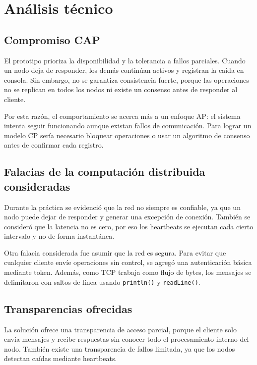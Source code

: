 \documentclass[12pt,a4paper]{article}
\begin{document}
\section{Análisis técnico}

\subsection{Compromiso CAP}

El prototipo prioriza la disponibilidad y la tolerancia a fallos parciales. Cuando un nodo deja de responder, los demás continúan activos y registran la caída en consola. Sin embargo, no se garantiza consistencia fuerte, porque las operaciones no se replican en todos los nodos ni existe un consenso antes de responder al cliente.

Por esta razón, el comportamiento se acerca más a un enfoque AP: el sistema intenta seguir funcionando aunque existan fallos de comunicación. Para lograr un modelo CP sería necesario bloquear operaciones o usar un algoritmo de consenso antes de confirmar cada registro.

\subsection{Falacias de la computación distribuida consideradas}

Durante la práctica se evidenció que la red no siempre es confiable, ya que un nodo puede dejar de responder y generar una excepción de conexión. También se consideró que la latencia no es cero, por eso los heartbeats se ejecutan cada cierto intervalo y no de forma instantánea.

Otra falacia considerada fue asumir que la red es segura. Para evitar que cualquier cliente envíe operaciones sin control, se agregó una autenticación básica mediante token. Además, como TCP trabaja como flujo de bytes, los mensajes se delimitaron con saltos de línea usando \texttt{println()} y \texttt{readLine()}.

\subsection{Transparencias ofrecidas}

La solución ofrece una transparencia de acceso parcial, porque el cliente solo envía mensajes y recibe respuestas sin conocer todo el procesamiento interno del nodo. También existe una transparencia de fallos limitada, ya que los nodos detectan caídas mediante heartbeats.
\end{document}
